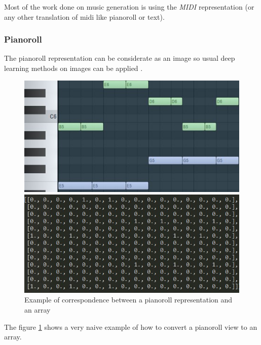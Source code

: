 \documentclass[12pt]{report}
\begin{document}
Most of the work done on music generation is using the \textit{MIDI} representation (or any other translation of midi like pianoroll or text).

\subsubsection{Pianoroll}

The pianoroll representation can be considerate as an image so usual deep learning methods on images can  be applied \cite{huang_counterpoint_2017}.

\begin{figure}[H]
   \begin{minipage}{0.5\textwidth}
     \centering
     \includegraphics[width=.9\linewidth]{images/music/pianoroll/pianoroll_small.jpg}
   \end{minipage}\hfill
   \begin{minipage}{0.5\textwidth}
     \centering
     \includegraphics[width=\linewidth]{images/music/pianoroll/pianoroll_small_array.jpg}
   \end{minipage}
 \caption{Example of correspondence between a pianoroll representation and an array}
 \label{fig:pianoroll_to_array}
\end{figure}

The figure \ref{fig:pianoroll_to_array} shows a very naive example of how to convert a pianoroll view to an array.
\end{document}
